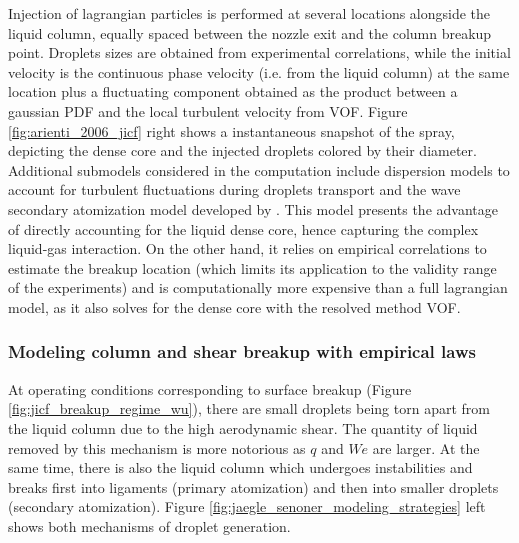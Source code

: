 Injection of lagrangian particles is performed at several locations alongside the liquid column, equally spaced between the nozzle exit and the column breakup point. Droplets sizes are obtained from experimental correlations, while the initial velocity is the continuous phase velocity (i.e. from the liquid column) at the same location plus a fluctuating component obtained as the product between a gaussian PDF and the local turbulent velocity from VOF. Figure \ref{fig:arienti_2006_jicf} right shows a instantaneous snapshot of the spray, depicting the dense core and the injected droplets colored by their diameter. Additional submodels considered in the computation include dispersion models to account for turbulent fluctuations during droplets transport  and the wave secondary atomization model developed by . This model presents the advantage of directly accounting for the liquid dense core, hence capturing the complex liquid-gas interaction. On the other hand, it relies on empirical correlations to estimate the breakup location (which limits its application to the validity range of the experiments) and is computationally more expensive than a full lagrangian model, as it also solves for the dense core with the resolved method VOF.




\subsubsection*{Modeling column and shear breakup with empirical laws }

At operating conditions corresponding to surface breakup (Figure \ref{fig:jicf_breakup_regime_wu}), there are small droplets being torn apart from the liquid column due to the high aerodynamic shear. The quantity of liquid removed by this mechanism is more notorious as $q$ and $We$ are larger. At the same time, there is also the liquid column which undergoes instabilities and breaks first into ligaments (primary atomization) and then into smaller droplets (secondary atomization). Figure \ref{fig:jaegle_senoner_modeling_strategies} left shows both mechanisms of droplet generation.

